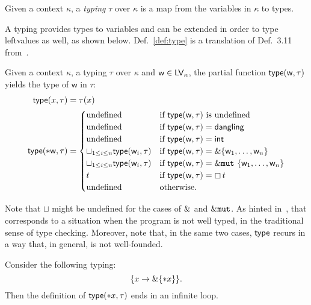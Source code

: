 \begin{definition}[Typing]\label{def:typing}
  Given a context $\kappa$, a \emph{typing} $\tau$ over $\kappa$ is
  a map from the variables in $\kappa$ %
  to types.
\end{definition}

A typing provides types to variables and can be extended in order to type
leftvalues as well, as shown below. Def.~\ref{def:type} is a translation of
Def.~3.11 from~\cite{Pearce21}.

\begin{definition}\label{def:type}
  Given a context $\kappa$, a typing $\tau$ over $\kappa$
  and $\mathsf{w}\in\mathsf{LV}_\kappa$, the partial function
  $\mathsf{type}(\mathsf{w},\tau)$ yields the type of $\mathsf{w}$ in $\tau$:
  \begin{align*}
    \mathsf{type}(x,\tau)&=\tau(x)\\
    \mathsf{type}(*\mathsf{w},\tau)&=\begin{cases}
    \text{undefined} & \text{if $\mathsf{type}(\mathsf{w},\tau)$ is undefined}\\
    \text{undefined} & \text{if $\mathsf{type}(\mathsf{w},\tau)=\mathsf{dangling}$}\\
    \text{undefined} & \text{if $\mathsf{type}(\mathsf{w},\tau)=\mathsf{int}$}\\
    \sqcup_{1\le i\le n}\mathsf{type}(\mathsf{w}_i,\tau) & \text{if $\mathsf{type}(\mathsf{w},\tau)=\&\{\mathsf{w}_1,\ldots,\mathsf{w}_n\}$}\\
    \sqcup_{1\le i\le n}\mathsf{type}(\mathsf{w}_i,\tau) & \text{if $\mathsf{type}(\mathsf{w},\tau)=\&\mathtt{mut}\ \{\mathsf{w}_1,\ldots,\mathsf{w}_n\}$}\\
    t & \text{if $\mathsf{type}(\mathsf{w},\tau)=\boxempty\,{t}$}\\
    \text{undefined} & \text{otherwise.}
    \end{cases}
  \end{align*}
\end{definition}

\noindent
Note that $\sqcup$ might be undefined for the cases of $\&$
and $\&\mathtt{mut}$.
As hinted in~\cite{Pearce21}, that corresponds to a situation when the program
is not well typed, in the traditional sense of type checking.
Moreover, note that, in the same two cases, $\mathsf{type}$ recurs in a way that, in general,
is not well-founded.

\begin{example}\label{ex:type_divergence}
  Consider the following typing:
  \[
  \{x\to\&\{\mathtt{*}x\}\}.
  \]
  Then the definition of $\mathsf{type}(\mathtt{*}x,\tau)$ ends in an infinite loop.
\end{example}

